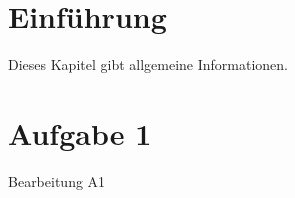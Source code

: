 \documentclass[11pt,a4paper,oneside,ngerman]{report}
\begin{document}
\begingroup\let\clearpage\relax
\tableofcontents \endgroup


\chapter{Einführung}
\thispagestyle{headings}
Dieses Kapitel gibt allgemeine Informationen.


\chapter{Aufgabe 1}
\thispagestyle{headings}
Bearbeitung A1











\end{document}
